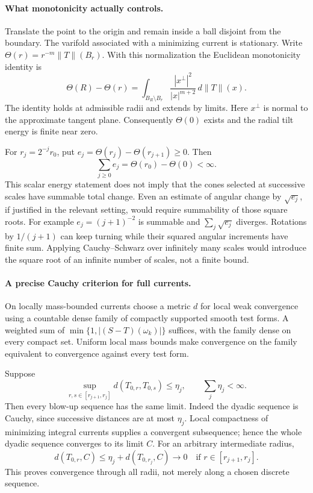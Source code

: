 \documentclass[11pt]{article}
\begin{document}
\paragraph{What monotonicity actually controls.}
Translate the point to the origin and remain inside a ball disjoint
from the boundary. The varifold associated with a minimizing current
is stationary. Write $\Theta(r)=r^{-m}\|T\|(B_r)$.
With this normalization the Euclidean monotonicity identity is
\begin{equation}\label{a418:mono}
 \Theta(R)-\Theta(r)=
 \int_{B_R\setminus B_r}
 \frac{|x^\perp|^2}{|x|^{m+2}}\,d\|T\|(x).
\end{equation}
The identity holds at admissible radii and extends by limits.
Here $x^\perp$ is normal to the approximate tangent plane.
Consequently $\Theta(0)$ exists and the radial tilt energy
is finite near zero.

For $r_j=2^{-j}r_0$, put
$e_j=\Theta(r_j)-\Theta(r_{j+1})\geq0$. Then
\[
                  \sum_{j\geq0}e_j=\Theta(r_0)-\Theta(0)<\infty.
\]
This scalar energy statement does not imply that the cones
selected at successive scales have summable total change.
Even an estimate of angular change by $\sqrt{e_j}$, if
justified in the relevant setting, would require summability
of those square roots. For example $e_j=(j+1)^{-2}$ is
summable and $\sum_j\sqrt{e_j}$ diverges. Rotations by
$1/(j+1)$ can keep turning while their squared angular
increments have finite sum. Applying Cauchy--Schwarz
over infinitely many scales would introduce the square
root of an infinite number of scales, not a finite bound.

\paragraph{A precise Cauchy criterion for full currents.}
On locally mass-bounded currents choose a metric $d$ for
local weak convergence using a countable dense family of
compactly supported smooth test forms. A weighted sum
of $\min\{1,|(S-T)(\omega_k)|\}$ suffices, with the family
dense on every compact set. Uniform local mass bounds
make convergence on the family equivalent to convergence
against every test form.

Suppose
\begin{equation}\label{a418:oscillation}
 \sup_{r,s\in[r_{j+1},r_j]}d(T_{0,r},T_{0,s})\leq\eta_j,
 \qquad \sum_j\eta_j<\infty.
\end{equation}
Then every blow-up sequence has the same limit. Indeed the
dyadic sequence is Cauchy, since successive distances are
at most $\eta_j$. Local compactness of minimizing integral
currents supplies a convergent subsequence; hence the
whole dyadic sequence converges to its limit $C$.
For an arbitrary intermediate radius,
\[
 d(T_{0,r},C)\leq\eta_j+d(T_{0,r_j},C)\longrightarrow0
 \quad\text{if }r\in[r_{j+1},r_j].
\]
This proves convergence through all radii, not merely
along a chosen discrete sequence.
\end{document}

